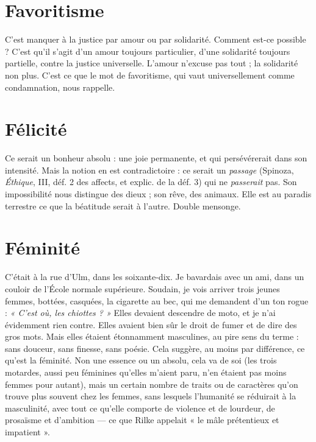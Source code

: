 \section{Favoritisme}
C'est manquer à la justice par amour ou par solidarité.
Comment est-ce possible ? C’est qu’il s’agit d’un amour
toujours particulier, d’une solidarité toujours partielle, contre la justice universelle.
L'amour n’excuse pas tout ; la solidarité non plus. C’est ce que le mot de
favoritisme, qui vaut universellement comme condamnation, nous rappelle.

\section{Félicité}
Ce serait un bonheur absolu : une joie permanente, et qui persévérerait
dans son intensité. Mais la notion en est contradictoire :
ce serait un {\it passage} (Spinoza, {\it Éthique}, III, déf. 2 des affects, et explic. de la
déf. 3) qui ne {\it passerait} pas. Son impossibilité nous distingue des dieux ; son
rêve, des animaux. Elle est au paradis terrestre ce que la béatitude serait à
l'autre. Double mensonge.

\section{Féminité}
C'était à la rue d’Ulm, dans les soixante-dix. Je bavardais avec
un ami, dans un couloir de l’École normale supérieure. Soudain,
je vois arriver trois jeunes femmes, bottées, casquées, la cigarette au bec,
qui me demandent d’un ton rogue : {\it « C'est où, les chiottes ? »} Elles devaient descendre
de moto, et je n’ai évidemment rien contre. Elles avaient bien sûr le
droit de fumer et de dire des gros mots. Mais elles étaient étonnamment masculines,
au pire sens du terme : sans douceur, sans finesse, sans poésie. Cela
suggère, au moins par différence, ce qu'est la féminité. Non une essence ou un
absolu, cela va de soi (les trois motardes, aussi peu féminines qu’elles m’aient
paru, n’en étaient pas moins femmes pour autant), mais un certain nombre de
traits ou de caractères qu’on trouve plus souvent chez les femmes, sans lesquels
l'humanité se réduirait à la masculinité, avec tout ce qu’elle comporte de violence
et de lourdeur, de prosaïsme et d’ambition — ce que Rilke appelait « le
mâle prétentieux et impatient ».

